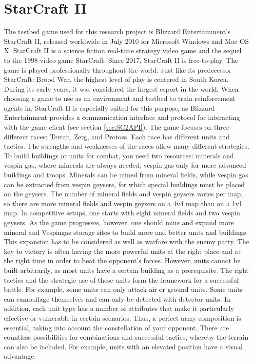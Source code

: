 \documentclass[12pt,a4paper]{article}
\begin{document}
\section{StarCraft II}\label{sec:SC2}
The testbed game used for this research project is Blizzard Entertainment's StarCraft II, released worldwide in July 2010 for Microsoft Windows and Mac OS X. StarCraft II is a science fiction real-time strategy video game and the sequel to the 1998 video game StarCraft. Since 2017, StarCraft II is free-to-play. The game is played professionally throughout the world. Just like its predecessor StarCraft: Brood War, the highest level of play is centered in South Korea. During its early years, it was considered the largest esport in the world.
When choosing a game to use as an environment and testbed to train reinforcement agents in, StarCraft II is especially suited for this purpose, as Blizzard Entertainment provides a communication interface and protocol for interacting with the game client (see section \ref{sec:SC2API}).
The game focuses on three different races: Terran, Zerg, and Protoss. Each race has different units and tactics. The strengths and weaknesses of the races allow many different strategies.
To build buildings or units for combat, you need two resources: minerals and vespin gas, where minerals are always needed, vespin gas only for more advanced buildings and troops. Minerals can be mined from mineral fields, while vespin gas can be extracted from vespin geysers, for which special buildings must be placed on the geysers. The number of mineral fields and vespin geysers varies per map, so there are more mineral fields and vespin geysers on a 4v4 map than on a 1v1 map.
In competitive setups, one starts with eight mineral fields and two vespin geysers. As the game progresses, however, one should mine and expand more mineral and Vespingas storage sites to build more and better units and buildings. This expansion has to be considered as well as warfare with the enemy party.
The key to victory is often having the more powerful units at the right place and at the right time in order to beat the opponent's forces.
However, units cannot be built arbitrarily, as most units have a certain building as a prerequisite. The right tactics and the strategic use of these units form the framework for a successful battle. For example, some units can only attack air or ground units. Some units can camouflage themselves and can only be detected with detector units. In addition, each unit type has a number of attributes that make it particularly effective or vulnerable in certain scenarios. Thus, a perfect army composition is essential, taking into account the constellation of your opponent. There are countless possibilities for combinations and successful tactics, whereby the terrain can also be included. For example, units with an elevated position have a visual advantage.
\end{document}
